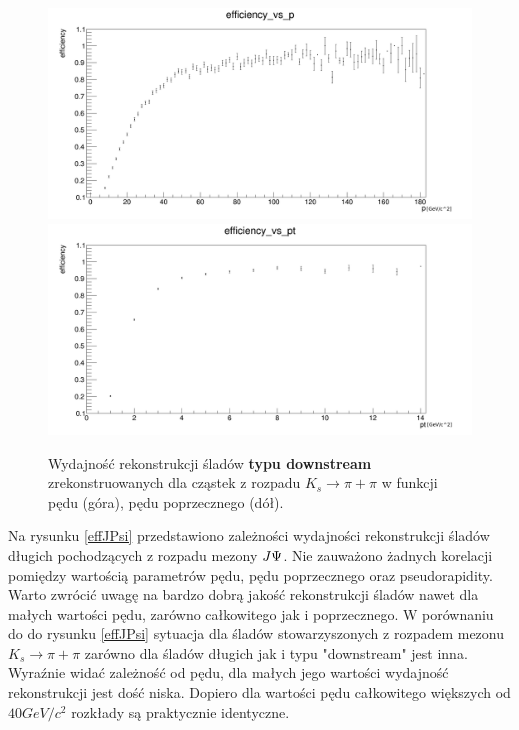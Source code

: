 \begin{figure}[H]
\centering
\includegraphics[scale=0.25]{rozdzial6/KsDD_p.png} \\
\includegraphics[scale=0.25]{rozdzial6/KsDD_pt.png} \\
\caption{Wydajność rekonstrukcji śladów \textbf{typu downstream} zrekonstruowanych dla cząstek z rozpadu $K_s \rightarrow \pi + \pi $  w funkcji pędu (góra), pędu poprzecznego (dół).}
\label{KsDD}
\end{figure}

Na rysunku \ref{effJPsi} przedstawiono zależności wydajności rekonstrukcji śladów długich pochodzących z rozpadu mezony $J\/ \Psi$.  Nie zauważono żadnych korelacji pomiędzy wartością parametrów pędu, pędu poprzecznego oraz pseudorapidity. Warto zwrócić uwagę na bardzo dobrą jakość rekonstrukcji śladów nawet dla małych wartości pędu, zarówno całkowitego jak i poprzecznego. W porównaniu do do rysunku \ref{effJPsi} sytuacja dla śladów stowarzyszonych z rozpadem mezonu $K_s \rightarrow \pi + \pi $ zarówno dla śladów długich jak i typu "downstream" jest inna. Wyraźnie widać zależność od pędu, dla małych jego wartości wydajność rekonstrukcji jest dość niska. Dopiero dla wartości pędu całkowitego większych od $40GeV/c^2$ rozkłady są praktycznie identyczne. 

